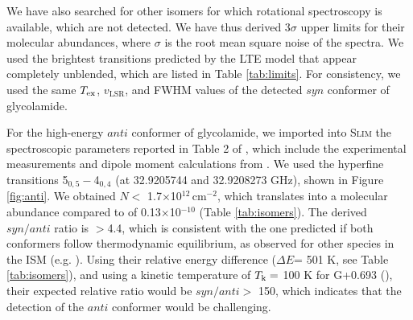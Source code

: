 \documentclass[twocolumn]{aastex63}
\begin{document}
We have also searched for other  isomers for which rotational spectroscopy is available, which are not detected. We have thus derived 3$\sigma$ upper limits for their molecular abundances, where $\sigma$ is the root mean square noise of the spectra. We used  the brightest transitions predicted by the LTE model that appear completely unblended, which are listed in Table \ref{tab:limits}. For consistency, we used the same $T_{\rm ex}$, $v_\text{LSR}$, and FWHM values of the detected $syn$ conformer of glycolamide. 

For the high-energy $anti$ conformer of glycolamide, we imported into \textsc{Slim} the spectroscopic parameters reported in Table 2 of \citet{sanz-novo2020}, which include the experimental measurements and dipole moment calculations from \citet{maris2004}.
We used the hyperfine transitions 5$_{0,5}-$4$_{0,4}$ (at 32.9205744 and 32.9208273 GHz), shown in Figure \ref{fig:anti}. 
We obtained $N<$ 1.7$\times$10$^{12}$\,cm$^{-2}$, which translates into a molecular abundance compared to  of 0.13$\times$10$^{-10}$ (Table \ref{tab:isomers}). The derived $syn/anti$ ratio is $>$4.4, which is consistent with the one predicted if both conformers follow thermodynamic equilibrium, as observed for other species in the ISM (e.g. \citealt{rivilla_chemical_2017,rivilla2019b,garciadelaconcepcion2021}). Using their relative energy difference ($\Delta E$= 501 K, see Table \ref{tab:isomers}), and using a kinetic temperature of $T_{\rm k} =$ 100 K for G+0.693 (\citealt{zeng2018}), their expected relative ratio would be $syn/anti>$ 150, which indicates that the detection of the $anti$ conformer would be challenging.
\end{document}
